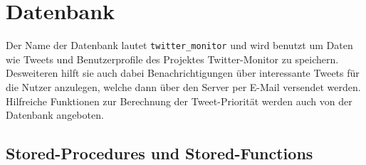 \section{Datenbank}

Der Name der Datenbank lautet \texttt{twitter\_monitor} und wird benutzt um Daten wie Tweets und 
Benutzerprofile des Projektes Twitter-Monitor zu speichern. Desweiteren hilft sie auch dabei 
Benachrichtigungen über interessante Tweets für die Nutzer anzulegen, welche dann über den Server 
per E-Mail versendet werden. Hilfreiche Funktionen zur Berechnung der Tweet-Priorität werden auch
von der Datenbank angeboten. 

\subsection{Stored-Procedures und Stored-Functions}

